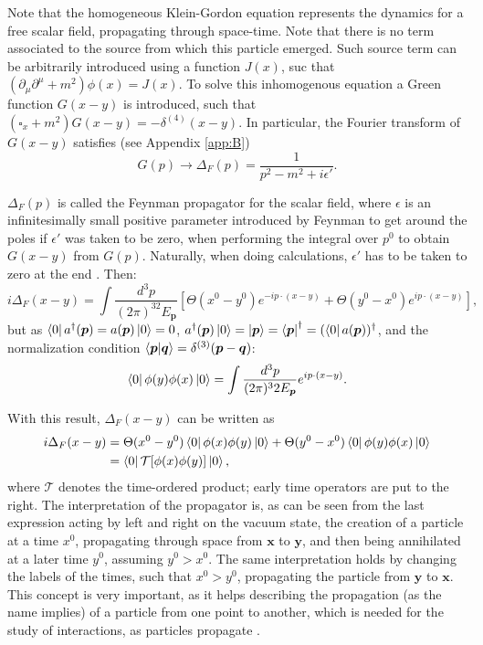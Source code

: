 Note that the homogeneous Klein-Gordon equation represents the dynamics for a free scalar field, propagating through space-time. Note that there is no term associated to the source from which this particle emerged. Such source term can be arbitrarily introduced using a function $J(x)$, suc that $(\partial_{\mu}\partial^{\mu} + m^2)\phi(x) = J(x)$. To solve this inhomogenous equation a Green function $G(x-y)$ is introduced, such that $(\square_x + m^2)G(x-y)=-\delta^{(4)}(x-y)$. In particular, the Fourier transform of $G(x-y)$ satisfies (see Appendix \ref{app:B})
\begin{equation*}
    G(p) \rightarrow \Delta_F(p) = \dfrac{1}{p^2 - m^2 + i\epsilon'}.
\end{equation*}

$\Delta_F(p)$ is called the Feynman propagator for the scalar field, where $\epsilon$ is an infinitesimally small positive parameter introduced by Feynman to get around the poles if $\epsilon'$ was taken to be zero, when performing the integral over $p^0$ to obtain $G(x-y)$ from $G(p)$. Naturally, when doing calculations, $\epsilon'$ has to be taken to zero at the end \cite{Lahiri}. Then:
\begin{equation*}
    i\Delta_F(x-y) = \int \dfrac{d^3p}{(2\pi)^32E_{\bm{p}}} \left[\Theta(x^0-y^0)e^{-ip\cdot(x-y)} + \Theta(y^0-x^0)e^{ip\cdot(x-y)}\right],
\end{equation*}
but as $\bra{0}a^{\dagger}(\bm{p}) = a(\bm{p})\ket{0} = 0$, $a^{\dagger}(\bm{p})\ket{0} = \ket{\bm{p}} = \bra{\bm{p}}^{\dagger} = (\bra{0}a(\bm{p}))^{\dagger}$, and the normalization condition $\bra{\bm{p}}\ket{\bm{q}} = \delta^{(3)}(\bm{p}-\bm{q})$:
\begin{equation*}
    \bra{0}\phi(y)\phi(x)\ket{0} = \int \dfrac{d^3p}{(2\pi)^32E_{\bm{p}}} e^{ip\cdot(x-y)}.
\end{equation*}

With this result, $\Delta_F(x-y)$ can be written as
\begin{align*}
    i\Delta_F(x-y) &= \Theta(x^0-y^0)\bra{0}\phi(x)\phi(y)\ket{0} + \Theta(y^0-x^0)\bra{0}\phi(y)\phi(x)\ket{0}\\ 
    &= \bra{0}\mathcal{T}[\phi(x)\phi(y)]\ket{0},
\end{align*}
where $\mathcal{T}$ denotes the time-ordered product; early time operators are put to the right. The interpretation of the propagator is, as can be seen from the last expression acting by left and right on the vacuum state, the creation of a particle at a time $x^0$, propagating through space from $\bm{x}$ to $\bm{y}$, and then being annihilated at a later time $y^0$, assuming $y^0 > x^0$. The same interpretation holds by changing the labels of the times, such that $x^0 > y^0$, propagating the particle from $\bm{y}$ to $\bm{x}$. This concept is very important, as it helps describing the propagation (as the name implies) of a particle from one point to another, which is needed for the study of interactions, as particles propagate \cite{Lahiri}.

